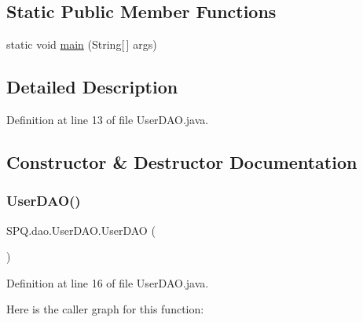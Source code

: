 \subsection*{Static Public Member Functions}
\begin{DoxyCompactItemize}
\item 
static void \mbox{\hyperlink{class_s_p_q_1_1dao_1_1_user_d_a_o_a8f6efdd35a56fedb08c9c9c62586c36b}{main}} (String\mbox{[}$\,$\mbox{]} args)
\end{DoxyCompactItemize}


\subsection{Detailed Description}


Definition at line 13 of file User\+D\+A\+O.\+java.



\subsection{Constructor \& Destructor Documentation}
\mbox{\label{class_s_p_q_1_1dao_1_1_user_d_a_o_ae1c3b0aaf2795cc7d4afec61cce3ec02}} 
\subsubsection{\texorpdfstring{User\+D\+A\+O()}{UserDAO()}\hspace{0.1cm}{\footnotesize\ttfamily [1/4]}}
{\footnotesize\ttfamily S\+P\+Q.\+dao.\+User\+D\+A\+O.\+User\+D\+AO (\begin{DoxyParamCaption}{ }\end{DoxyParamCaption})}



Definition at line 16 of file User\+D\+A\+O.\+java.

Here is the caller graph for this function\+:
\mbox{\label{class_s_p_q_1_1dao_1_1_user_d_a_o_ae1c3b0aaf2795cc7d4afec61cce3ec02}} 
